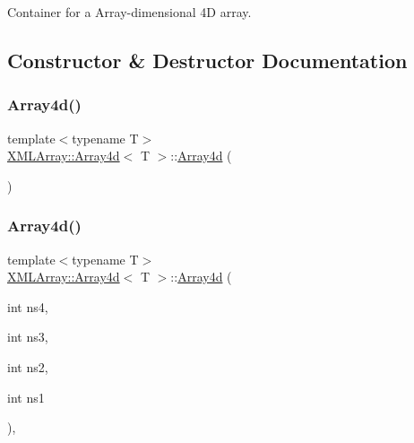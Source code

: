 Container for a Array-\/dimensional 4D array. 

\subsection{Constructor \& Destructor Documentation}
\mbox{\label{classXMLArray_1_1Array4d_a4ce7f5a0bcb93fd0bd98a5fa0eb09a3d}} 
\subsubsection{\texorpdfstring{Array4d()}{Array4d()}\hspace{0.1cm}{\footnotesize\ttfamily [1/9]}}
{\footnotesize\ttfamily template$<$typename T$>$ \\
\mbox{\hyperlink{classXMLArray_1_1Array4d}{X\+M\+L\+Array\+::\+Array4d}}$<$ T $>$\+::\mbox{\hyperlink{classXMLArray_1_1Array4d}{Array4d}} (\begin{DoxyParamCaption}{ }\end{DoxyParamCaption})\hspace{0.3cm}{\ttfamily [inline]}}

\mbox{\label{classXMLArray_1_1Array4d_a409005374380cbfb8553f3237db7990b}} 
\subsubsection{\texorpdfstring{Array4d()}{Array4d()}\hspace{0.1cm}{\footnotesize\ttfamily [2/9]}}
{\footnotesize\ttfamily template$<$typename T$>$ \\
\mbox{\hyperlink{classXMLArray_1_1Array4d}{X\+M\+L\+Array\+::\+Array4d}}$<$ T $>$\+::\mbox{\hyperlink{classXMLArray_1_1Array4d}{Array4d}} (\begin{DoxyParamCaption}\item[{int}]{ns4,  }\item[{int}]{ns3,  }\item[{int}]{ns2,  }\item[{int}]{ns1 }\end{DoxyParamCaption})\hspace{0.3cm}{\ttfamily [inline]}, {\ttfamily [explicit]}}

